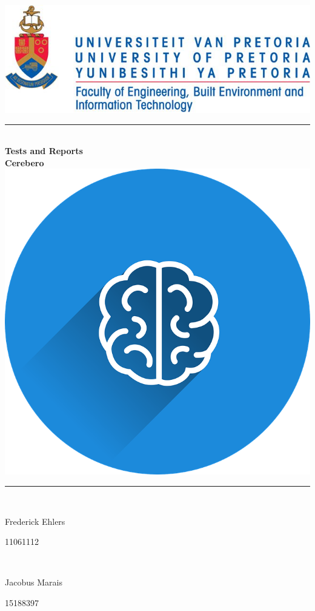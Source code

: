 \begin{titlepage}
	
	\begin{center}
		\includegraphics[width=0.7\linewidth]{Images/uniLogo.jpg}\\
		\rule{\linewidth}{0.5mm} \\[0.5cm]
		{ \huge \bfseries Tests and Reports}\\[0.3cm]
		{ \huge \bfseries Cerebero}\\[0.3cm]
		\includegraphics[width=0.2\linewidth]{Images/cerebero.png}\\
		\rule{\linewidth}{0.6mm} \\[0.5cm] 		
  
		
		\begin{minipage}{0.4\textwidth}
			\begin{flushleft} \large
				Frederick Ehlers 
			\end{flushleft}
		\end{minipage}
		\begin{minipage}{0.4\textwidth}
			\begin{flushright} \large
				11061112
			\end{flushright}
		\end{minipage} \\[0.2cm]

		\begin{minipage}{0.4\textwidth}
			\begin{flushleft} \large
				 Jacobus Marais
			\end{flushleft}
		\end{minipage}
		\begin{minipage}{0.4\textwidth}
			\begin{flushright} \large
				15188397 
			\end{flushright}
		\end{minipage}\\[0.2cm]


\end{center}
\end{titlepage}
